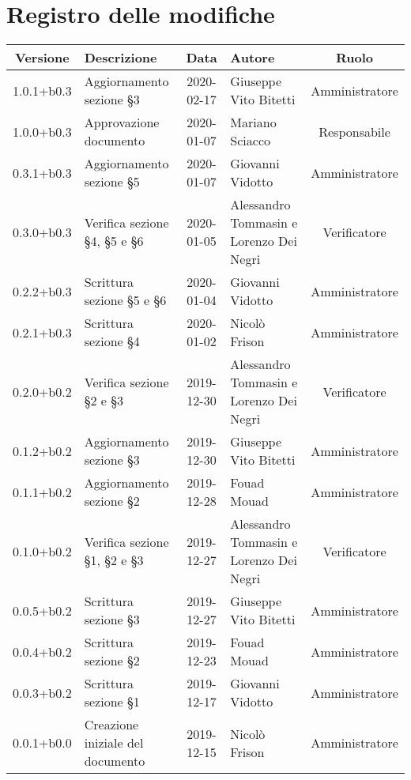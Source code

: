 \section*{Registro delle modifiche}

\begin{center}
	\begin{longtable}{|c|p{3cm}|c|p{4cm}|c|}
	\hline
	\rowcolor{lighter-grayer}
	\textbf{Versione} & \textbf{Descrizione} & \textbf{Data} & \textbf{Autore} & \textbf{Ruolo} \\
	\hline
	\endfirsthead

	1.0.1+b0.3 & Aggiornamento sezione \S3  & 2020-02-17 & Giuseppe Vito Bitetti & Amministratore \\
	\hline
	1.0.0+b0.3 & Approvazione documento & 2020-01-07 & Mariano Sciacco & Responsabile \\
	\hline
	0.3.1+b0.3 & Aggiornamento sezione \S5 & 2020-01-07 & Giovanni Vidotto & Amministratore \\
	\hline
	0.3.0+b0.3 & Verifica sezione \S4, \S5 e \S6 & 2020-01-05 & Alessandro Tommasin e Lorenzo Dei Negri & Verificatore \\
	\hline
	0.2.2+b0.3 & Scrittura sezione \S5 e \S6 & 2020-01-04 & Giovanni Vidotto & Amministratore \\
	\hline
	0.2.1+b0.3 &  Scrittura sezione \S4 & 2020-01-02 & Nicolò Frison & Amministratore \\
	\hline
	0.2.0+b0.2 & Verifica sezione \S2 e \S3 & 2019-12-30 & Alessandro Tommasin e Lorenzo Dei Negri & Verificatore \\
	\hline
	0.1.2+b0.2 & Aggiornamento sezione \S3  & 2019-12-30 & Giuseppe Vito Bitetti & Amministratore \\
	\hline
	0.1.1+b0.2 & Aggiornamento sezione \S2  & 2019-12-28 & Fouad Mouad & Amministratore \\
	\hline
	0.1.0+b0.2 & Verifica sezione \S1, \S2 e \S3 & 2019-12-27 & Alessandro Tommasin e Lorenzo Dei Negri & Verificatore \\
	\hline
	0.0.5+b0.2 & Scrittura sezione \S3 & 2019-12-27  & Giuseppe Vito Bitetti & Amministratore \\
	\hline
	0.0.4+b0.2 & Scrittura sezione \S2 & 2019-12-23 & Fouad Mouad & Amministratore \\
	\hline
	0.0.3+b0.2 & Scrittura sezione \S1 & 2019-12-17 & Giovanni Vidotto & Amministratore \\
	\hline
	0.0.1+b0.0 & Creazione iniziale del documento & 2019-12-15 & Nicolò Frison & Amministratore \\
	\hline

	\end{longtable}
\end{center}
